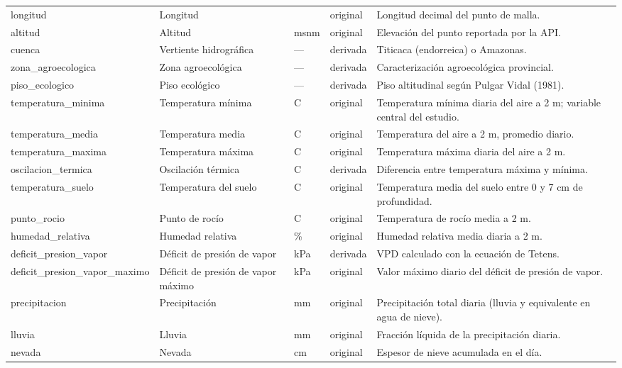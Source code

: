 \begin{longtable}{>{\raggedright\arraybackslash}p{2.8cm}>{\raggedright\arraybackslash}p{2.9cm}>{\centering\arraybackslash}p{1.2cm}>{\centering\arraybackslash}p{1.5cm}>{\raggedright\arraybackslash}p{5.5cm}}
longitud & Longitud & \textdegree{} & original & Longitud decimal del punto de malla. \\
altitud & Altitud & msnm & original & Elevación del punto reportada por la API. \\
cuenca & Vertiente hidrográfica & — & derivada & Titicaca (endorreica) o Amazonas. \\
zona\_\allowbreak{}agroecologica & Zona agroecológica & — & derivada & Caracterización agroecológica provincial. \\
piso\_\allowbreak{}ecologico & Piso ecológico & — & derivada & Piso altitudinal según Pulgar Vidal (1981). \\
temperatura\_\allowbreak{}minima & Temperatura mínima & \textdegree{}C & original & Temperatura mínima diaria del aire a 2 m; variable central del estudio. \\
temperatura\_\allowbreak{}media & Temperatura media & \textdegree{}C & original & Temperatura del aire a 2 m, promedio diario. \\
temperatura\_\allowbreak{}maxima & Temperatura máxima & \textdegree{}C & original & Temperatura máxima diaria del aire a 2 m. \\
oscilacion\_\allowbreak{}termica & Oscilación térmica & \textdegree{}C & derivada & Diferencia entre temperatura máxima y mínima. \\
temperatura\_\allowbreak{}suelo & Temperatura del suelo & \textdegree{}C & original & Temperatura media del suelo entre 0 y 7 cm de profundidad. \\
punto\_\allowbreak{}rocio & Punto de rocío & \textdegree{}C & original & Temperatura de rocío media a 2 m. \\
humedad\_\allowbreak{}relativa & Humedad relativa & \% & original & Humedad relativa media diaria a 2 m. \\
deficit\_\allowbreak{}presion\_\allowbreak{}vapor & Déficit de presión de vapor & kPa & derivada & VPD calculado con la ecuación de Tetens. \\
deficit\_\allowbreak{}presion\_\allowbreak{}vapor\_\allowbreak{}maximo & Déficit de presión de vapor máximo & kPa & original & Valor máximo diario del déficit de presión de vapor. \\
precipitacion & Precipitación & mm & original & Precipitación total diaria (lluvia y equivalente en agua de nieve). \\
lluvia & Lluvia & mm & original & Fracción líquida de la precipitación diaria. \\
nevada & Nevada & cm & original & Espesor de nieve acumulada en el día. \\

\end{longtable}
